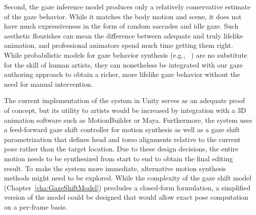 Second, the gaze inference model produces only a relatively conservative estimate of the gaze behavior. While it matches the body motion and scene, it does not have much expressiveness in the form of random saccades and idle gaze. Such aesthetic flourishes can mean the difference between adequate and truly lifelike animation, and professional animators spend much time getting them right. While probabilistic models for gaze behavior synthesis (e.g., ~\citep{lee2002eyes}) are no substitute for the skill of human artists, they can nonetheless be integrated with our gaze authoring approach to obtain a richer, more lifelike gaze behavior without the need for manual intervention.

The current implementation of the system in Unity serves as an adequate proof of concept, but its utility to artists would be increased by integration with a 3D animation software such as MotionBuilder or Maya. Furthermore, the system uses a feed-forward gaze shift controller for motion synthesis as well as a gaze shift parametrization that defines head and torso alignments relative to the current pose rather than the target location. Due to these design decisions, the entire motion needs to be synthesized from start to end to obtain the final editing result. To make the system more immediate, alternative motion synthesis methods might need to be explored. While the complexity of the gaze shift model (Chapter~\ref{cha:GazeShiftModel}) precludes a closed-form formulation, a simplified version of the model could be designed that would allow exact pose computation on a per-frame basis.

